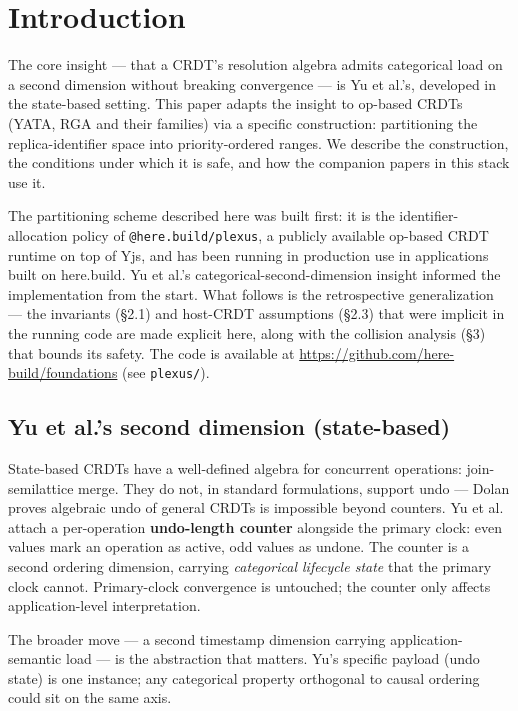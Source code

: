 \section{Introduction}

The core insight --- that a CRDT's resolution algebra admits categorical load on a second dimension without breaking convergence --- is Yu et al.'s\cite{yu2019opodis}, developed in the state-based setting. This paper adapts the insight to op-based CRDTs (YATA, RGA and their families) via a specific construction: partitioning the replica-identifier space into priority-ordered ranges. We describe the construction, the conditions under which it is safe, and how the companion papers in this stack use it.

The partitioning scheme described here was built first: it is the identifier-allocation policy of \texttt{@here.build/plexus}, a publicly available op-based CRDT runtime on top of Yjs, and has been running in production use in applications built on here.build. Yu et al.'s categorical-second-dimension insight\cite{yu2019opodis} informed the implementation from the start. What follows is the retrospective generalization --- the invariants (§2.1) and host-CRDT assumptions (§2.3) that were implicit in the running code are made explicit here, along with the collision analysis (§3) that bounds its safety. The code is available at \url{https://github.com/here-build/foundations} (see \texttt{plexus/}).

\subsection{Yu et al.'s second dimension (state-based)}

State-based CRDTs have a well-defined algebra for concurrent operations: join-semilattice merge. They do not, in standard formulations, support undo --- Dolan\cite{dolan2020undoable} proves algebraic undo of general CRDTs is impossible beyond counters. Yu et al.\cite{yu2019opodis} attach a per-operation \textbf{undo-length counter} alongside the primary clock: even values mark an operation as active, odd values as undone. The counter is a second ordering dimension, carrying \emph{categorical lifecycle state} that the primary clock cannot. Primary-clock convergence is untouched; the counter only affects application-level interpretation.

The broader move --- a second timestamp dimension carrying application-semantic load --- is the abstraction that matters. Yu's specific payload (undo state) is one instance; any categorical property orthogonal to causal ordering could sit on the same axis.

